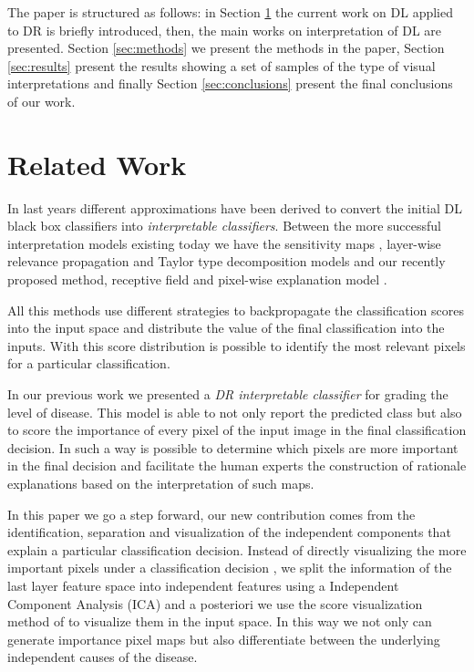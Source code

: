 \documentclass{llncs}
\begin{document}
The paper is structured as follows: in Section \ref{sec:related} the current work on DL applied to DR is briefly introduced, then, the main works on interpretation of DL are presented. Section \ref{sec:methods} we present the methods in the paper, Section \ref{sec:results} present the results showing a set of samples of the type of visual interpretations and finally Section \ref{sec:conclusions} present the final conclusions of our work.

\section{Related Work}\label{sec:related}

In last years different approximations have been derived to convert the initial DL black box classifiers into \emph{interpretable classifiers}. Between the more successful interpretation models existing today we have the sensitivity maps \cite{DBLP:journals/corr/SimonyanVZ13}, layer-wise relevance propagation \cite{bach2015pixel} and Taylor type decomposition models \cite{montavon2017explaining} and our recently proposed method, receptive field and pixel-wise explanation model \cite{de2017deep}. 

All this methods use different strategies to backpropagate the classification scores into the input space and distribute the value of the final classification into the inputs. With this score distribution is possible to identify the most relevant pixels for a particular classification. 

In our previous work \cite{de2017deep} we presented a \emph{DR interpretable classifier} for grading the level of disease. This model is able to not only report the predicted class but also to score the importance of every pixel of the input image in the final classification decision. In such a way is possible to determine which pixels are more important in the final decision and facilitate the human experts the construction of rationale explanations based on the interpretation of such maps. 

In this paper we go a step forward, our new contribution comes from the identification, separation and visualization of the independent components that explain a particular classification decision. Instead of directly visualizing the more important pixels under a classification decision \cite{de2017deep}, we split the information of the last layer feature space into independent features using a Independent Component Analysis (ICA) and a posteriori we use the score visualization method of \cite{de2017deep} to visualize them in the input space. In this way we not only can generate importance pixel maps but also differentiate between the underlying independent causes of the disease.
\end{document}
